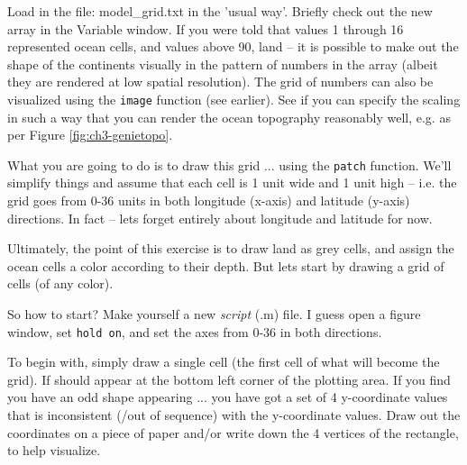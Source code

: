 \documentclass{tufte-book} %
\begin{document}
Load in the file: \textsf{model\_grid.txt} in the 'usual way'. Briefly check out the new array in the \textsf{Variable window}. If you were told that values 1 through 16 represented ocean cells, and values above 90, land -- it is possible to make out the shape of the continents visually in the pattern of numbers in the array (albeit they are rendered at low spatial resolution). The grid of numbers can also be visualized using the \texttt{image} function (see earlier). See if you can specify the scaling in such a way that you can render the ocean topography reasonably well, e.g. as per Figure \ref{fig:ch3-genietopo}.

What you are going to do is to draw this grid ... using the \texttt{patch} function. We'll simplify things and assume that each cell is 1 unit wide and 1 unit high -- i.e. the grid goes from 0-36 units in both longitude (x-axis) and latitude (y-axis) directions. In fact -- lets forget entirely about longitude and latitude for now.

Ultimately, the point of this exercise is to draw land as grey cells, and assign the ocean cells a color according to their depth. But lets start by drawing a grid of cells (of any color).

So how to start? Make yourself a new \textit{script} (\textsf{.m}) file. I guess open a \textsf{figure window}, set \texttt{hold on}, and set the axes from 0-36 in both directions.

To begin with, simply draw a single cell (the first cell of what will become the grid). If should appear at the bottom left corner of the plotting area. If you find you have an odd shape appearing ... you have got a set of 4 y-coordinate values that is inconsistent (/out of sequence) with the y-coordinate values. Draw out the coordinates on a piece of paper and/or write down the 4 vertices of the rectangle, to help visualize.
\end{document}
